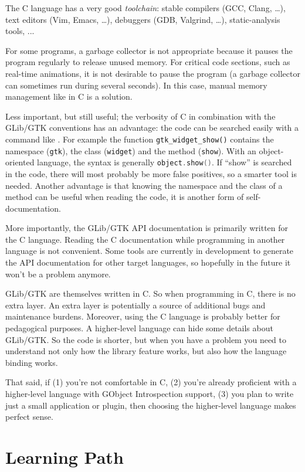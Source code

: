 The C language has a very good \emph{toolchain}: stable compilers (GCC, Clang, …), text editors (Vim, Emacs, …), debuggers (GDB, Valgrind, …), static-analysis tools, ...

For some programs, a garbage collector is not appropriate because it pauses the program regularly to release unused memory. For critical code sections, such as real-time animations, it is not desirable to pause the program (a garbage collector can sometimes run during several seconds). In this case, manual memory management like in C is a solution.

Less important, but still useful; the verbosity of C in combination with the GLib/GTK conventions has an advantage: the code can be searched easily with a command like . For example the function \lstinline{gtk_widget_show()} contains the namespace (\lstinline{gtk}), the class (\lstinline{widget}) and the method (\lstinline{show}). With an object-oriented language, the syntax is generally \lstinline[language=C++]{object.show()}. If ``show'' is searched in the code, there will most probably be more false positives, so a smarter tool is needed. Another advantage is that knowing the namespace and the class of a method can be useful when reading the code, it is another form of self-documentation.

More importantly, the GLib/GTK API documentation is primarily written for the C language. Reading the C documentation while programming in another language is not convenient. Some tools are currently in development to generate the API documentation for other target languages, so hopefully in the future it won't be a problem anymore.

GLib/GTK are themselves written in C. So when programming in C, there is no extra layer. An extra layer is potentially a source of additional bugs and maintenance burdens. Moreover, using the C language is probably better for pedagogical purposes. A higher-level language can hide some details about GLib/GTK. So the code is shorter, but when you have a problem you need to understand not only how the library feature works, but also how the language binding works.

That said, if (1) you're not comfortable in C, (2) you're already proficient with a higher-level language with GObject Introspection support, (3) you plan to write just a small application or plugin, then choosing the higher-level language makes perfect sense.

\section{Learning Path}
\label{intro-learning-path}

